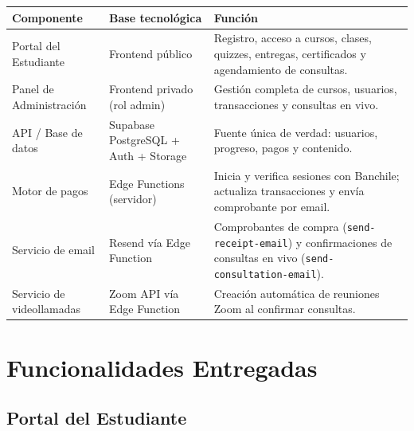 \documentclass[a4paper,11pt]{article}
\begin{document}
\renewcommand{\arraystretch}{1.3}
\begin{longtable}{L{3.8cm} L{3.8cm} L{7cm}}
\toprule
\textbf{Componente} & \textbf{Base tecnol\'ogica} & \textbf{Funci\'on} \\
\midrule
\endhead
\bottomrule
\endfoot

Portal del Estudiante &
  Frontend p\'ublico &
  Registro, acceso a cursos, clases, quizzes, entregas, certificados
  y agendamiento de consultas. \\

Panel de Administraci\'on &
  Frontend privado (rol admin) &
  Gesti\'on completa de cursos, usuarios, transacciones y consultas en vivo. \\

API / Base de datos &
  Supabase PostgreSQL + Auth + Storage &
  Fuente \'unica de verdad: usuarios, progreso, pagos y contenido. \\

Motor de pagos &
  Edge Functions (servidor) &
  Inicia y verifica sesiones con Banchile; actualiza transacciones
  y env\'ia comprobante por email. \\

Servicio de email &
  Resend v\'ia Edge Function &
  Comprobantes de compra (\texttt{send-receipt-email}) y
  confirmaciones de consultas en vivo (\texttt{send-consultation-email}). \\

Servicio de videollamadas &
  Zoom API v\'ia Edge Function &
  Creaci\'on autom\'atica de reuniones Zoom al confirmar consultas. \\

\end{longtable}


\section{Funcionalidades Entregadas}

\subsection{Portal del Estudiante}
\end{document}

